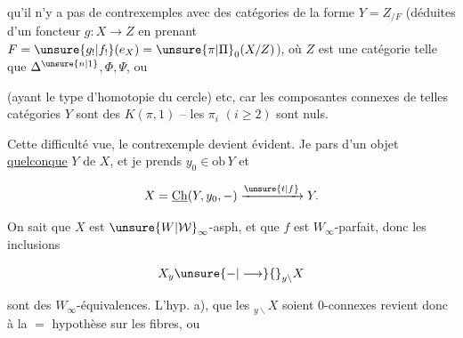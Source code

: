
qu'il n'y a pas de contrexemples avec des catégories  \deleted{\unsure{$\Delta$}} de la forme $Y=Z_{/F}$ \unsure{$\alpha$} (déduites d'un foncteur $g:X\to Z$ en prenant $F=\unsure{g_!|f_!}(e_X)=\unsure{\pi|\Pi}_0(X/Z)$), où $Z$ est une catégorie telle que $\Delta^{\unsure{n|1}}$$, \Phi,\Psi$, ou

\diagram{\begin{tikzcd}[ampersand replacement=\&,row sep=tiny,column sep=tiny]
\& \cdot \&\\
\cdot \arrow[ur] \arrow[dr] \& \& \cdot \arrow[ul] \arrow[dl]\\
\& \cdot \&
\end{tikzcd}}

(ayant le type d'homotopie du cercle) etc, car les composantes connexes de telles catégories $Y$ sont des $K(\pi,1)$ -- les $\pi_i$  $(i\geq 2)$ sont nuls.

Cette difficulté vue, le contrexemple devient évident. Je pars d'un objet  \uline{quelconque} $Y$ de $X$, et je prends $y_0\in\mathrm{ob}\,Y$ et

\[
X=\underline{\mathrm{Ch}}(Y,y_0,-)\xrightarrow{\unsure{t|f}}Y.
\]

 On sait que $X$ est $\unsure{W|\mathcal W}_\infty$-asph, et que $f$ est $W_\infty$-parfait, donc les inclusions

\[
X_y\unsure{-|\longrightarrow}{}_{y\backslash}X
\]

sont des $W_\infty$-équivalences. L'hyp. a), que les $ {}_{y\backslash}X$ soient 0-connexes revient donc à la $=$ hypothèse sur les fibres, ou
